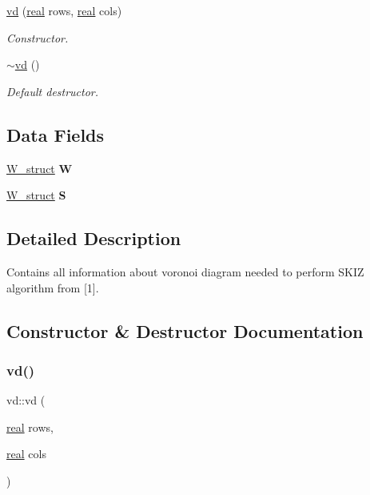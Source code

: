 \begin{DoxyCompactItemize}
\mbox{\hyperlink{classvd_a765c16ee377a2a0f9651d555edd3a158}{vd}} (\mbox{\hyperlink{typedefs_8h_a58a0c7cf2501f4492da833421be92547}{real}} rows, \mbox{\hyperlink{typedefs_8h_a58a0c7cf2501f4492da833421be92547}{real}} cols)
\begin{DoxyCompactList}\small\item\em Constructor. \end{DoxyCompactList}\item 
\mbox{\label{classvd_a331bc7a75e3f5ea3b750d1d22a9df287}} 
\mbox{\hyperlink{classvd_a331bc7a75e3f5ea3b750d1d22a9df287}{$\sim$vd}} ()
\begin{DoxyCompactList}\small\item\em Default destructor. \end{DoxyCompactList}\end{DoxyCompactItemize}
\subsection*{Data Fields}
\begin{DoxyCompactItemize}
\item 
\mbox{\label{classvd_ab23d33e6c11c46ad3302a874a4726542}} 
\mbox{\hyperlink{structW__struct}{W\+\_\+struct}} {\bfseries W}
\item 
\mbox{\label{classvd_a960c80ec5b52938f999f528a5e3cccf1}} 
\mbox{\hyperlink{structW__struct}{W\+\_\+struct}} {\bfseries S}
\end{DoxyCompactItemize}


\subsection{Detailed Description}
Contains all information about voronoi diagram needed to perform S\+K\+IZ algorithm from \mbox{[}1\mbox{]}. 

\subsection{Constructor \& Destructor Documentation}
\mbox{\label{classvd_a765c16ee377a2a0f9651d555edd3a158}} 
\subsubsection{\texorpdfstring{vd()}{vd()}}
{\footnotesize\ttfamily vd\+::vd (\begin{DoxyParamCaption}\item[{\mbox{\hyperlink{typedefs_8h_a58a0c7cf2501f4492da833421be92547}{real}}}]{rows,  }\item[{\mbox{\hyperlink{typedefs_8h_a58a0c7cf2501f4492da833421be92547}{real}}}]{cols }\end{DoxyParamCaption})}



